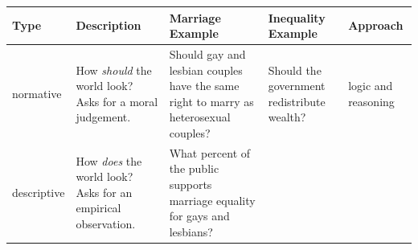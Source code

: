 \documentclass[]{book}
\theoremstyle{definition}
\theoremstyle{definition}
\theoremstyle{definition}
\theoremstyle{remark}
\begin{document}
\begin{longtable}[]{@{}lllll@{}}
\toprule
\begin{minipage}[b]{0.17\columnwidth}\raggedright\strut
Type\strut
\end{minipage} & \begin{minipage}[b]{0.17\columnwidth}\raggedright\strut
Description\strut
\end{minipage} & \begin{minipage}[b]{0.14\columnwidth}\raggedright\strut
Marriage Example\strut
\end{minipage} & \begin{minipage}[b]{0.21\columnwidth}\raggedright\strut
Inequality Example\strut
\end{minipage} & \begin{minipage}[b]{0.12\columnwidth}\raggedright\strut
Approach\strut
\end{minipage}\tabularnewline
\midrule
\endhead
\begin{minipage}[t]{0.17\columnwidth}\raggedright\strut
normative\strut
\end{minipage} & \begin{minipage}[t]{0.17\columnwidth}\raggedright\strut
How \emph{should} the world look? Asks for a moral judgement.\strut
\end{minipage} & \begin{minipage}[t]{0.14\columnwidth}\raggedright\strut
Should gay and lesbian couples have the same right to marry as
heterosexual couples?\strut
\end{minipage} & \begin{minipage}[t]{0.21\columnwidth}\raggedright\strut
Should the government redistribute wealth?\strut
\end{minipage} & \begin{minipage}[t]{0.12\columnwidth}\raggedright\strut
logic and reasoning\strut
\end{minipage}\tabularnewline
\begin{minipage}[t]{0.17\columnwidth}\raggedright\strut
descriptive\strut
\end{minipage} & \begin{minipage}[t]{0.17\columnwidth}\raggedright\strut
How \emph{does} the world look? Asks for an empirical observation.\strut
\end{minipage} & \begin{minipage}[t]{0.14\columnwidth}\raggedright\strut
What percent of the public supports marriage equality for gays and
lesbians?\strut
\end{minipage} & \begin{minipage}[t]{0.21\columnwidth}\raggedright\strut

\end{minipage}
\end{longtable}
\end{document}
